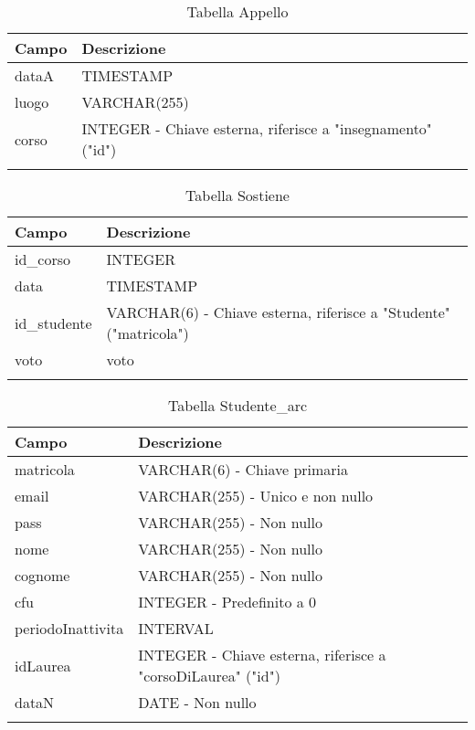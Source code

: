 \begin{table}[ht]
\centering
\caption{Tabella Appello}
\begin{tabularx}{\textwidth}{lX}
\toprule
\textbf{Campo} & \textbf{Descrizione} \\
\midrule
dataA & TIMESTAMP \\
luogo & VARCHAR(255) \\
corso & INTEGER - Chiave esterna, riferisce a "insegnamento" ("id") \\
\bottomrule
\label{tab:appello}

\end{tabularx}
\end{table}

\begin{table}[ht]
\centering
\caption{Tabella Sostiene}
\begin{tabularx}{\textwidth}{lX}
\toprule
\textbf{Campo} & \textbf{Descrizione} \\
\midrule
id_corso & INTEGER \\
data & TIMESTAMP \\
id_studente & VARCHAR(6) - Chiave esterna, riferisce a "Studente" ("matricola") \\
voto & voto \\
\bottomrule
\label{tab:sostiene}
\end{tabularx}
\end{table}


\begin{table}[ht]
\centering
\caption{Tabella Studente\_arc}
\begin{tabularx}{\textwidth}{lX}
\toprule
\textbf{Campo} & \textbf{Descrizione} \\
\midrule
matricola & VARCHAR(6) - Chiave primaria \\
email & VARCHAR(255) - Unico e non nullo \\
pass & VARCHAR(255) - Non nullo \\
nome & VARCHAR(255) - Non nullo \\
cognome & VARCHAR(255) - Non nullo \\
cfu & INTEGER - Predefinito a 0 \\
periodoInattivita & INTERVAL \\
idLaurea & INTEGER - Chiave esterna, riferisce a "corsoDiLaurea" ("id") \\
dataN & DATE - Non nullo \\
\bottomrule
\label{tab:studenteArc}
\end{tabularx}
\end{table}

